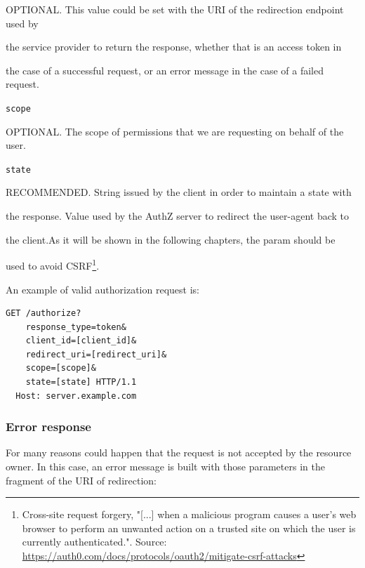 \hspace{0.5cm}OPTIONAL. This value could be set with the URI of the redirection endpoint used by 

\hspace{0.5cm}the service provider to return the response, whether that is an access token in 

\hspace{0.5cm}the case of a successful request, or an error message in the case of a failed request.

\texttt{scope}

\hspace{0.5cm}OPTIONAL. The scope of permissions that we are requesting on behalf of the user.

\vspace{0.5cm}

\texttt{state}

\hspace{0.5cm}RECOMMENDED. String issued by the client in order to maintain a state with

\hspace{0.5cm}the response. Value used by the AuthZ server to redirect the user-agent back to

\hspace{0.5cm}the client.As it will be shown in the following chapters, the param should be

\hspace{0.5cm}used to avoid CSRF\footnote{Cross-site request forgery, "[...] when a malicious program causes a user's web browser to perform an unwanted action on a trusted site on which the user is currently authenticated.". Source: \url{https://auth0.com/docs/protocols/oauth2/mitigate-csrf-attacks}}.

\noindent An example of valid authorization request is:

\begin{lstlisting}[basicstyle=\ttfamily]
  GET /authorize?
    response_type=token&
    client_id=[client_id]&
    redirect_uri=[redirect_uri]&
    scope=[scope]&
    state=[state] HTTP/1.1
  Host: server.example.com
\end{lstlisting}

\subsubsection{Error response}
\label{tokenerr}
For many reasons could happen that the request is not accepted by the resource owner. In this case, an error message is built with those parameters in the fragment of the URI of redirection:

